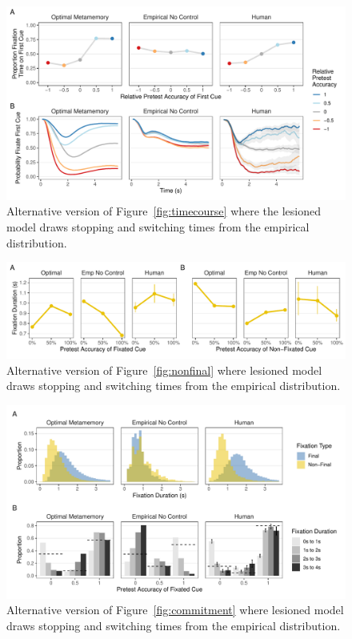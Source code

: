 \begin{figure}[ht]
  \centering
  \includegraphics[scale=.65]{figs/memory/exp2_alt/overall_timecourse.pdf}
  \caption{Alternative version of Figure~\ref{fig:timecourse} where the lesioned model draws stopping and switching times from the empirical distribution.}
  \label{fig:timecourse_alt}
\end{figure}

\begin{figure}[t]
  \includegraphics[scale=.65]{figs/memory/exp2_alt/fixation_durations.pdf}
  \caption{Alternative version of Figure~\ref{fig:nonfinal} where lesioned model draws stopping and switching times from the empirical distribution.}
  \label{fig:nonfinal_alt}
\end{figure}

\begin{figure}[t]
  \includegraphics[scale=.65]{figs/memory/exp2_alt/commitment.pdf}
  \caption{Alternative version of Figure~\ref{fig:commitment} where lesioned model draws stopping and switching times from the empirical distribution.}
  \label{fig:commitment_alt}
\end{figure}


